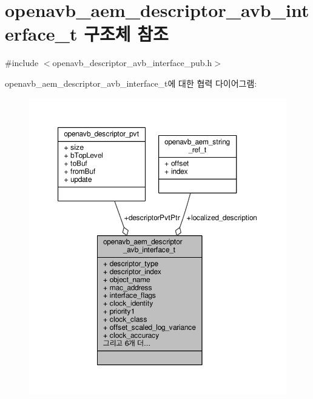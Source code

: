 \hypertarget{structopenavb__aem__descriptor__avb__interface__t}{}\section{openavb\+\_\+aem\+\_\+descriptor\+\_\+avb\+\_\+interface\+\_\+t 구조체 참조}
\label{structopenavb__aem__descriptor__avb__interface__t}


{\ttfamily \#include $<$openavb\+\_\+descriptor\+\_\+avb\+\_\+interface\+\_\+pub.\+h$>$}



openavb\+\_\+aem\+\_\+descriptor\+\_\+avb\+\_\+interface\+\_\+t에 대한 협력 다이어그램\+:
\nopagebreak
\begin{figure}[H]
\begin{center}
\leavevmode
\includegraphics[width=350pt]{structopenavb__aem__descriptor__avb__interface__t__coll__graph}
\end{center}
\end{figure}
